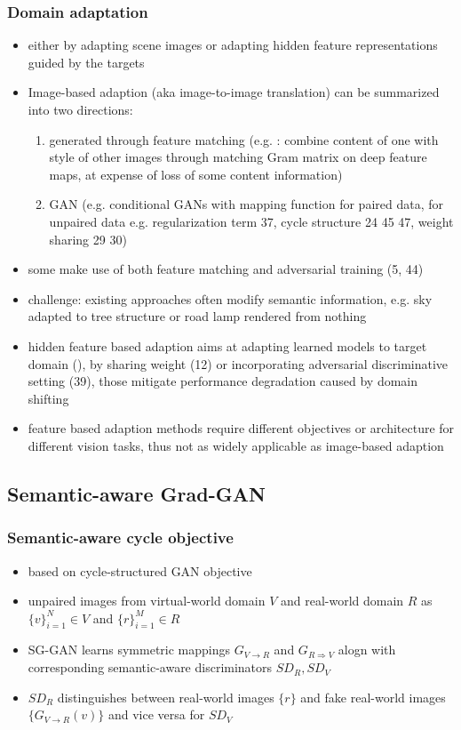 \subsubsection{Domain adaptation}
\begin{itemize}
	\item either by adapting scene images or adapting hidden feature representations guided by the targets
	\item Image-based adaption (aka image-to-image translation) can be summarized into two directions:
	\begin{enumerate}
		\item generated through feature matching (e.g. : combine content of one with style of other images through matching Gram matrix on deep feature maps, at expense of loss of some content information)
		\item GAN (e.g.  conditional GANs with mapping function for paired data, for unpaired data e.g. regularization term  37, cycle structure 24 45 47, weight sharing 29 30)
	\end{enumerate}
	\item some make use of both feature matching and adversarial training (5, 44)
	\item challenge: existing approaches often modify semantic information, e.g. sky adapted to tree structure or road lamp rendered from nothing
	\item hidden feature based adaption aims at adapting learned models to target domain (), by sharing weight (12) or incorporating adversarial discriminative setting (39), those mitigate performance degradation caused by domain shifting
	\item feature based adaption methods require different objectives or architecture for different vision tasks, thus not as widely applicable as image-based adaption
\end{itemize}

\subsection{Semantic-aware Grad-GAN}

\subsubsection{Semantic-aware cycle objective}
\begin{itemize}
	\item based on cycle-structured GAN objective
	\item unpaired images from virtual-world domain $V$ and real-world domain $R$ as $\{v\}^N_{i=1} \in V$ and $\{r\}^M_{i=1} \in R$
	\item SG-GAN learns symmetric mappings $G_{V\rightarrow R}$ and $G_{R\Rightarrow V}$ alogn with corresponding semantic-aware discriminators $SD_R, SD_V$
	\item $SD_R$ distinguishes between real-world images $\{r\}$ and fake real-world images $\{G_{V\rightarrow R}(v)\}$ and vice versa for $SD_V$
\end{itemize}

